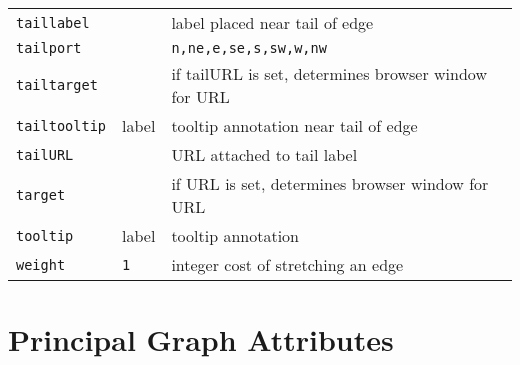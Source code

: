 \documentclass[11pt]{article}
\begin{document}
{{\begin{tabular}[t]{|l|l|p{3.5in}|}
{\tt taillabel} & & label placed near tail of edge \\
{\tt tailport} & & {\tt n,ne,e,se,s,sw,w,nw}\\
{\tt tailtarget} & & if tailURL is set, determines browser window for URL \\
{\tt tailtooltip} & label & tooltip annotation near tail of edge \\
{\tt tailURL} & & URL attached to tail label \\
{\tt target} & & if URL is set, determines browser window for URL \\
{\tt tooltip} & label & tooltip annotation \\
{\tt weight} & {\tt 1} & integer cost of stretching an edge \\
\hline
\end{tabular}
}

\section{Principal Graph Attributes}
\label{sec:graph_attr}

}
\end{document}
